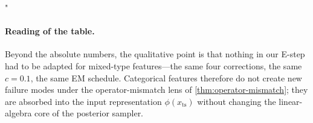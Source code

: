 "\documentclass{article}
\theoremstyle{plain}
\theoremstyle{definition}
\theoremstyle{remark}
\newcommand{\xts}{x_{\mathrm{ts}}}
\begin{document}
\begin{table}[h]
\centering
\caption{Discriminative score ($\downarrow$) on the mixed-type Traffic dataset at sequence lengths $24$ and $96$, drop rates $\{30\%, 50\%, 70\%\}$. Baseline column numbers are those reported by~\citet{fadlon2025imageni2r}; our cells are pending the Traffic run. The main claim is that the PSLR recipe runs unchanged on mixed-type features.}
\label{tab:traffic}
\end{table}

\paragraph{Reading of the table.}
Beyond the absolute numbers, the qualitative point is that nothing in our E-step had to be adapted for mixed-type features---the same four corrections, the same $c = 0.1$, the same EM schedule. Categorical features therefore do not create new failure modes under the operator-mismatch lens of \cref{thm:operator-mismatch}; they are absorbed into the input representation $\phi(\xts)$ without changing the linear-algebra core of the posterior sampler.
\end{document}
